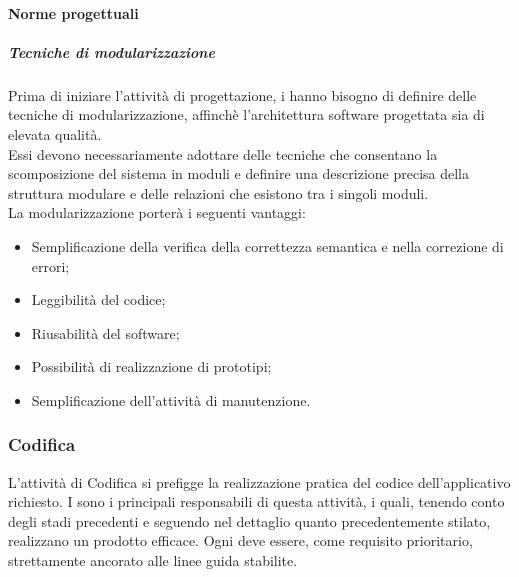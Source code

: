	\paragraph{Norme progettuali}
	\subparagraph{Tecniche di modularizzazione}
	Prima di iniziare l'attività di progettazione, i \textit{\Progs} hanno bisogno di definire delle tecniche di modularizzazione, affinchè l'architettura software progettata sia di elevata qualità.\\
	Essi devono necessariamente adottare delle tecniche che consentano la scomposizione del sistema in moduli e definire una descrizione precisa della struttura modulare e delle relazioni che esistono tra i singoli moduli.\\
	La modularizzazione porterà i seguenti vantaggi:
	\begin{itemize}
		\item Semplificazione della verifica della correttezza semantica e nella correzione di errori;
		\item Leggibilità del codice;
		\item Riusabilità del software;
		\item Possibilità di realizzazione di prototipi;
		\item Semplificazione dell'attività di manutenzione.
	\end{itemize}
	
	\subsubsection{Codifica}
	L'attività di Codifica si prefigge la realizzazione pratica del codice dell'applicativo richiesto. I \textit{\Progrs} sono i principali responsabili di questa attività, i quali, tenendo conto degli stadi precedenti e seguendo nel dettaglio quanto precedentemente stilato, realizzano un prodotto efficace. Ogni \textit{\Progr} deve essere, come requisito prioritario, strettamente ancorato alle linee guida stabilite.
	
